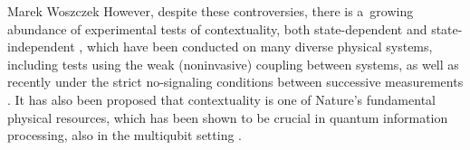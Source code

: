 \begin{artengenv}{Marek Woszczek}
However, despite these controversies, there is a~growing abundance of experimental tests of contextuality, both state-dependent
\parencites[e.g.][]{liu_experimental_2009}[][]{bartosik_experimental_2009}[][]{lapkiewicz_experimental_2011}[][]{ahrens_two_2013}[][]{borges_quantum_2014}[][]{marques_experimental_2014}[][]{singh_experimental_2019} %
 and state-independent 
\parencites[e.g.][]{amselem_state-independent_2009}[][]{kirchmair_state-independent_2009}[][]{zu_state-independent_2012}[][]{huang_experimental_2013}[][]{zhang_state-independent_2013}[][]{dambrosio_experimental_2013}[][]{canas_experimental_2014}[][]{dogra_experimental_2016}[][]{leupold_sustained_2018}[][]{qu_experimental_2020}, %
 which have been conducted on many diverse physical systems, including tests using the weak (noninvasive) coupling between systems, as well as recently under the strict no-signaling conditions between successive measurements 
\parencite[][]{xiao_experimental_2018}. %
 It has also been proposed that contextuality is one of Nature's fundamental physical resources, which has been shown to be crucial in quantum information processing, also in the multiqubit setting 
\parencites[][]{raussendorf_contextuality_2013}[][]{howard_contextuality_2014}[][]{bermejo-vega_contextuality_2017}.%



\end{artengenv}
